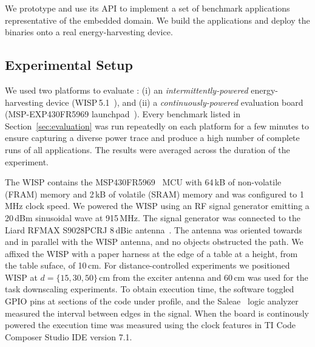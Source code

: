 We prototype \sys and use its API to implement a set of benchmark applications representative of the embedded domain. We build the applications and deploy the binaries onto a real energy-harvesting device. 


\subsection{Experimental Setup}
\label{sec:results_hardware_software}

We used two platforms to evaluate \sys: (i) an \emph{intermittently-powered}
energy-harvesting device (WISP\,5.1~\cite{wisp5,wisp}), and (ii) a \emph{continuously-powered} evaluation
board (MSP-EXP430FR5969 launchpad~\cite{MSP-EXP430FR5969_launchpad}).
%
Every benchmark listed in Section~\ref{sec:evaluation} was run repeatedly on
each platform for a few minutes to ensure capturing a diverse power 
trace and produce a high number of complete runs of all applications.
The results were averaged across the duration of the experiment.

The WISP contains the MSP430FR5969~\cite{wolverine} MCU with 64\,kB of
non-volatile (FRAM) memory and 2\,kB of volatile (SRAM) memory and was
configured to 1\,MHz clock speed.
%
We powered the WISP using an RF signal generator emitting a 20\,dBm sinusoidal wave at 915\,MHz.
The signal generator was connected to the Liard RFMAX S9028PCRJ 8\,dBic
antenna~\cite{atlas2015}.
%
The antenna was oriented towards and in parallel with the WISP antenna, and
no objects obstructed the path.
%
We affixed the WISP with a paper harness at the edge of a table at a height, from the table suface, of 10\,cm.
%
For distance-controlled experiments we positioned WISP at $d=\{15, 30,
50\}$\,cm from the exciter antenna and 60\,cm was used for the task downscaling
experiments.
%
%
To obtain execution time, the software toggled GPIO pins at sections of the code
under profile, and the Saleae~\cite{saleae} logic analyzer measured
the interval between edges in the signal. When the board is continously powered the 
execution time was measured using the clock features in TI Code Composer Studio IDE version 7.1.
%
